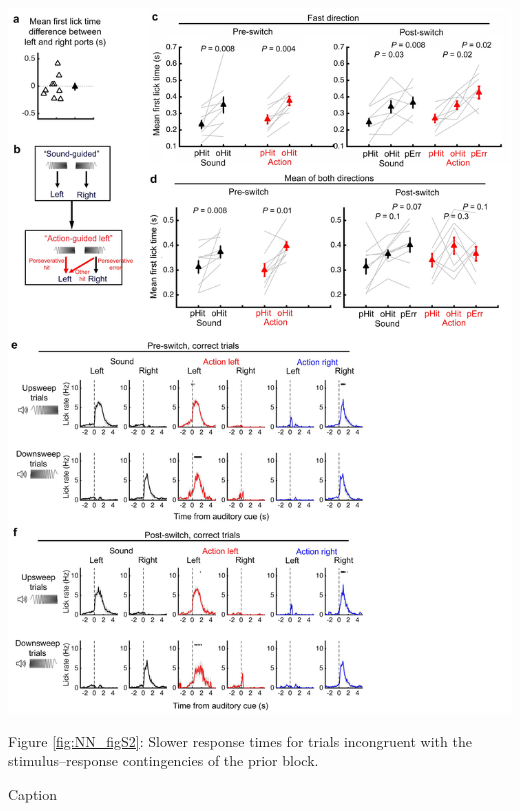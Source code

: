 \begin{FPfigure}

\begin{center}
\includegraphics[width=\textwidth]{Figures/NN_figS2.jpg} 
\end{center}
\small{Figure \ref{fig:NN_figS2}: Slower response times for trials incongruent with the stimulus–response contingencies of the prior block.}


\caption[Slower response times for trials incongruent with the stimulus–response contingencies of the prior block]
{Caption}

\label{fig:NN_figS2}
\end{FPfigure}

